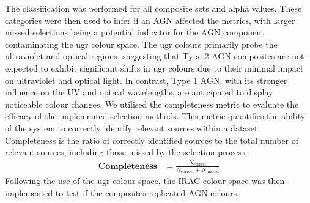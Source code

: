 The classification was performed for all composite sets and alpha values. These categories were then used to infer if an AGN affected the metrics, with larger missed selections being a potential indicator for the AGN component contaminating the ugr colour space.  The ugr colours primarily probe the ultraviolet and optical regions, suggesting that Type 2 AGN composites are not expected to exhibit significant shifts in ugr colours due to their minimal impact on ultraviolet and optical light. In contrast, Type 1 AGN, with its stronger influence on the UV and optical wavelengths, are anticipated to display noticeable colour changes. We utilised the completeness metric to evaluate the efficacy of the implemented selection methods. This metric quantifies the ability of the system to correctly identify relevant sources within a dataset. Completeness is the ratio of correctly identified sources to the total number of relevant sources, including those missed by the selection process.
\begin{align*}
\textbf{Completeness}  &= \frac{N_\text{correct}}{N_\text{correct} + N_\text{missed}}
\end{align*} 
Following the use of the ugr colour space, the IRAC colour space was then implemented to test if the composites replicated AGN colours.\\\\ 
